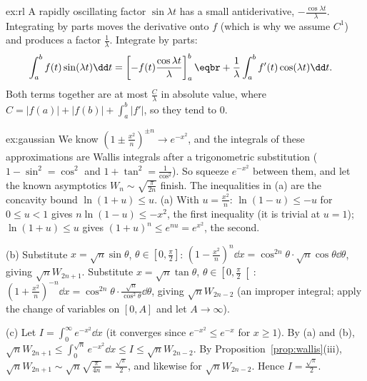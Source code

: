 \begin{solution}{ex:rl}
\idea A rapidly oscillating factor $\sin\lambda t$ has a small antiderivative, $-\frac{\cos\lambda t}\lambda$. Integrating by parts moves the derivative onto $f$ (which is why we assume $C^1$) and produces a factor $\frac1\lambda$.
\writeup Integrate by parts:
\[\begin{aligned}\int_a^bf(t)\sin(\lambda t)\dd t&=\left[-f(t)\frac{\cos\lambda t}\lambda\right]_a^b\eqbr+\frac1\lambda\int_a^bf'(t)\cos(\lambda t)\dd t.\end{aligned}\]
Both terms together are at most $\frac C\lambda$ in absolute value, where $C=|f(a)|+|f(b)|+\int_a^b|f'|$, so they tend to $0$.
\end{solution}

\begin{solution}{ex:gaussian}
\idea We know $\left(1\pm\frac{x^2}n\right)^{\pm n}\to e^{-x^2}$, and the integrals of these approximations are Wallis integrals after a trigonometric substitution ($1-\sin^2=\cos^2$ and $1+\tan^2=\frac1{\cos^2}$). So squeeze $e^{-x^2}$ between them, and let the known asymptotics $W_n\sim\sqrt{\frac\pi{2n}}$ finish. The inequalities in (a) are the concavity bound $\ln(1+u)\le u$.
\writeup (a) With $u=\frac{x^2}n$: $\ln(1-u)\le-u$ for $0\le u<1$ gives $n\ln(1-u)\le-x^2$, the first inequality (it is trivial at $u=1$); $\ln(1+u)\le u$ gives $(1+u)^n\le e^{nu}=e^{x^2}$, the second.

(b) Substitute $x=\sqrt n\sin\theta$, $\theta\in\left[0,\frac\pi2\right]$: $\left(1-\frac{x^2}n\right)^n\dd x=\cos^{2n}\theta\cdot\sqrt n\cos\theta\dd\theta$, giving $\sqrt nW_{2n+1}$.
Substitute $x=\sqrt n\tan\theta$, $\theta\in\left[0,\frac\pi2\right[$: $\left(1+\frac{x^2}n\right)^{-n}\dd x=\cos^{2n}\theta\cdot\frac{\sqrt n}{\cos^2\theta}\dd\theta$, giving $\sqrt nW_{2n-2}$ (an improper integral; apply the change of variables on $[0,A]$ and let $A\to\infty$).

(c) Let $I=\int_0^\infty e^{-x^2}\dd x$ (it converges since $e^{-x^2}\le e^{-x}$ for $x\ge1$). By (a) and (b),
$\sqrt nW_{2n+1}\le\int_0^{\sqrt n}e^{-x^2}\dd x\le I\le\sqrt nW_{2n-2}$. By Proposition~\ref{prop:wallis}(iii),
$\sqrt nW_{2n+1}\sim\sqrt n\sqrt{\frac\pi{4n}}=\frac{\sqrt\pi}2$, and likewise for $\sqrt nW_{2n-2}$. Hence $I=\frac{\sqrt\pi}2$.
\end{solution}


